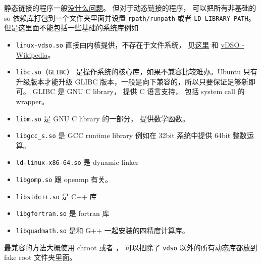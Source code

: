 静态链接的程序一般\href{https://stackoverflow.com/questions/31801824/is-static-linking-in-linux-portable}{没什么问题}。 但对于动态链接的程序， 可以把所有非基础的 so 依赖库打包到一个文件夹里面并设置 \verb|rpath/runpath| 或者 \verb|LD_LIBRARY_PATH|。 但是这里面不能包括一些基础的系统库例如
\begin{itemize}
\item \verb`linux-vdso.so` 直接由内核提供，不存在于文件系统， 见\href{https://unix.stackexchange.com/questions/476971/ldd-shows-no-location-after-arrow-library-does-not-exist-on-system}{这里} 和 \href{https://en.wikipedia.org/wiki/VDSO}{vDSO - Wikipedia}。
\item \verb`libc.so`（\verb`GLIBC`） 是操作系统的核心库，如果不兼容比较难办。Ubuntu 只有升级版本才能升级 GLIBC 版本，一般是向下兼容的，所以只要保证足够新即可。 GLIBC 是 GNU C library， 提供 C 语言支持， 包括 system call 的 wrapper。
\item \verb`libm.so` 是 GNU C library 的一部分， 提供数学函数。
\item \verb`libgcc_s.so` 是 GCC runtime library 例如在 32bit 系统中提供 64bit 整数运算。
\item \verb`ld-linux-x86-64.so` 是 dynamic linker
\item \verb`libgomp.so` 跟 openmp 有关。
\item \verb`libstdc++.so` 是 C++ 库
\item \verb`libgfortran.so` 是 fortran 库
\item \verb`libquadmath.so` 是和 G++ 一起安装的四精度计算库。
\end{itemize}

最兼容的方法大概使用 chroot 或者 ， 可以把除了 \verb|vdso| 以外的所有动态库都放到 fake root 文件夹里面。
